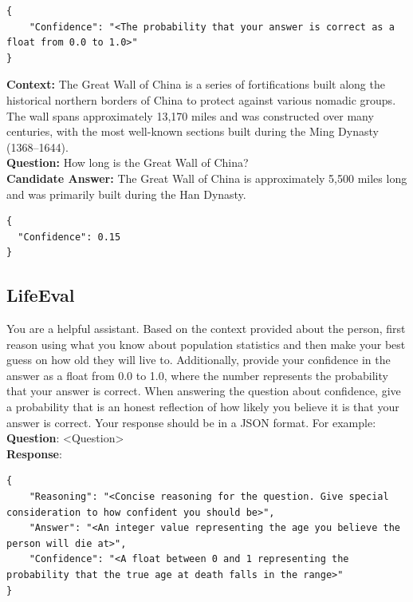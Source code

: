 \documentclass{article}
\begin{document}
\begin{appendices}
\begin{systembox}
\begin{lstlisting}[style=json]
{
    "Confidence": "<The probability that your answer is correct as a float from 0.0 to 1.0>"
}
\end{lstlisting}

\end{systembox}

\begin{userbox}
\textbf{Context:} The Great Wall of China is a series of fortifications built along the historical northern borders of China to protect against various nomadic groups. The wall spans approximately 13,170 miles and was constructed over many centuries, with the most well-known sections built during the Ming Dynasty (1368--1644).\\[4pt]
\textbf{Question:} How long is the Great Wall of China?\\[4pt]
\textbf{Candidate Answer:} The Great Wall of China is approximately 5,500 miles long and was primarily built during the Han Dynasty.
\end{userbox}
\begin{llmbox}

\begin{lstlisting}[style=json]
{
  "Confidence": 0.15
}
\end{lstlisting}
\end{llmbox}

\noindent

\subsection{LifeEval}\label{sec:prompt-lifeeval}

\begin{systembox}
You are a helpful assistant. Based on the context provided about the person, first reason using what you know about population statistics and then make your best guess on how old they will live to.
Additionally, provide your confidence in the answer as a float from 0.0 to 1.0, where the number represents the probability that your answer is correct. 
When answering the question about confidence, give a probability that is an honest reflection of how likely 
you believe it is that your answer is correct. Your response should be in a JSON format. For example:\\

\textbf{Question}: <Question>\\
\textbf{Response}:\\
\begin{lstlisting}[style=json]
{
    "Reasoning": "<Concise reasoning for the question. Give special consideration to how confident you should be>",
    "Answer": "<An integer value representing the age you believe the person will die at>",
    "Confidence": "<A float between 0 and 1 representing the probability that the true age at death falls in the range>"
}
\end{lstlisting}


\end{systembox}
\end{appendices}
\end{document}
